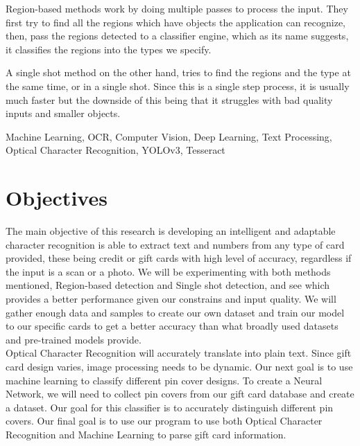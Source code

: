 \documentclass[conference]{IEEEtran}
\begin{document}
Region-based methods work by doing multiple passes to process the input. They first try to find all the regions which have objects the application can recognize, then, pass the regions detected to a classifier engine, which as its name suggests, it classifies the regions into the types we specify.

A single shot method on the other hand, tries to find the regions and the type at the same time, or in a single shot. Since this is a single step process, it is usually much faster but the downside of this being that it struggles with bad quality inputs and smaller objects.





\begin{IEEEkeywords}
  Machine Learning, OCR, Computer Vision, Deep Learning, Text Processing, Optical Character Recognition, YOLOv3, Tesseract
\end{IEEEkeywords}

%
\IEEEpeerreviewmaketitle



\section{Objectives}\label{section:Objectives}

The main objective of this research is developing an intelligent and adaptable character recognition is able to extract text and numbers from any type of card provided, these being credit or gift cards with high level of accuracy, regardless if the input is a scan or a photo.
We will be experimenting with both methods mentioned, Region-based detection and Single shot detection, and see which provides a better performance given our constrains and input quality.
We will gather enough data and samples to create our own dataset and train our model to our specific cards to get a better accuracy than what broadly used datasets and pre-trained models provide.\\

Optical Character Recognition will accurately translate into plain text. 
Since gift card design varies, image processing needs to be dynamic. Our next goal is to use machine learning to classify different pin cover designs. 
To create a Neural Network, we will need to collect pin covers from our gift card database and create a dataset. 
Our goal for this classifier is to accurately distinguish different pin covers. Our final goal is to use our program to use both Optical Character Recognition and Machine Learning to parse gift card information.\\
\end{document}
